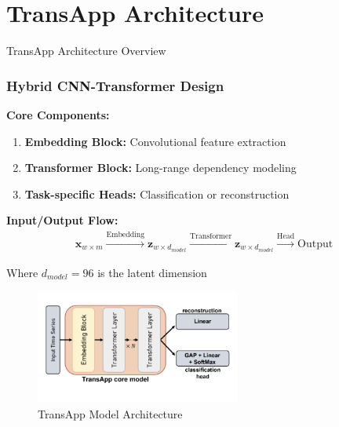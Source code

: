 \documentclass{beamer}
\begin{document}
\section{TransApp Architecture}

\begin{frame}{TransApp Architecture Overview}
\frametitle{Hybrid CNN-Transformer Design}

\textbf{Core Components:}
\begin{enumerate}
    \item \textbf{Embedding Block:} Convolutional feature extraction
    \item \textbf{Transformer Block:} Long-range dependency modeling
    \item \textbf{Task-specific Heads:} Classification or reconstruction
\end{enumerate}

\vspace{0.5cm}

\textbf{Input/Output Flow:}
\begin{align}
\mathbf{x}_{w \times m} \xrightarrow{\text{Embedding}} \mathbf{z}_{w \times d_{model}} \xrightarrow{\text{Transformer}} \mathbf{z}_{w \times d_{model}} \xrightarrow{\text{Head}} \text{Output}
\end{align}

Where $d_{model} = 96$ is the latent dimension

\vspace{0.5cm}
\begin{center}

\begin{figure}[h]
\centering
\includegraphics[width=0.6\textwidth]{trans-app.png}
\caption{TransApp Model Architecture}
\end{figure}

\end{center}

\end{frame}
\end{document}
